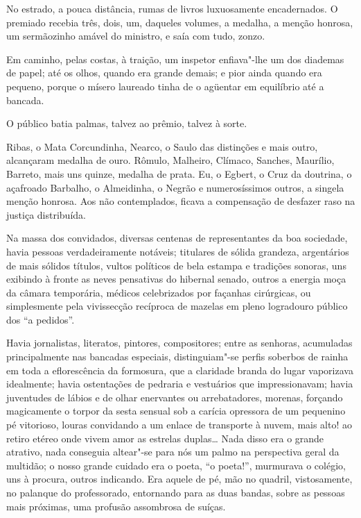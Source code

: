 No estrado, a pouca distância, rumas de livros luxuosamente
encadernados. O premiado recebia três, dois, um, daqueles volumes, a
medalha, a menção honrosa, um sermãozinho amável do ministro, e saía
com tudo, zonzo. 

Em caminho, pelas costas, à traição, um inspetor
enfiava"-lhe um dos diademas de papel; até os olhos, quando era grande
demais; e pior ainda quando era pequeno, porque o mísero laureado tinha
de o agüentar em equilíbrio até a bancada. 

O público batia palmas, talvez ao prêmio, talvez à sorte. 

Ribas, o Mata Corcundinha, Nearco, o
Saulo das distinções e mais outro, alcançaram medalha de ouro. Rômulo,
Malheiro, Clímaco, Sanches, Maurílio, Barreto, mais uns quinze, medalha
de prata. Eu, o Egbert, o Cruz da doutrina, o açafroado Barbalho, o
Almeidinha, o Negrão e numerosíssimos outros, a singela menção honrosa.
Aos não contemplados, ficava a compensação de desfazer raso na justiça
distribuída. 

Na massa dos convidados, diversas centenas de
representantes da boa sociedade, havia pessoas verdadeiramente
notáveis; titulares de sólida grandeza, argentários de mais sólidos
títulos, vultos políticos de bela estampa e tradições sonoras, uns
exibindo à fronte as neves pensativas do hibernal senado, outros a
energia moça da câmara temporária, médicos celebrizados por façanhas
cirúrgicas, ou simplesmente pela vivissecção recíproca de mazelas em
pleno logradouro público dos ``a pedidos''. 

Havia jornalistas, literatos,
pintores, compositores; entre as senhoras, acumuladas principalmente
nas bancadas especiais, distinguiam"-se perfis soberbos de rainha em
toda a eflorescência da formosura, que a claridade branda do lugar
vaporizava idealmente; havia ostentações de pedraria e vestuários que
impressionavam; havia juventudes de lábios e de olhar enervantes ou
arrebatadores, morenas, forçando magicamente o torpor da sesta sensual
sob a carícia opressora de um pequenino pé vitorioso, louras convidando
a um enlace de transporte à nuvem, mais alto! ao retiro etéreo onde
vivem amor as estrelas duplas\ldots{} Nada disso era o grande atrativo, nada
conseguia altear"-se para nós um palmo na perspectiva geral da
multidão; o nosso grande cuidado era o poeta, ``o poeta!'', murmurava o
colégio, uns à procura, outros indicando. Era aquele de pé, mão no
quadril, vistosamente, no palanque do professorado, entornando para as
duas bandas, sobre as pessoas mais próximas, uma profusão assombrosa de
suíças. 

